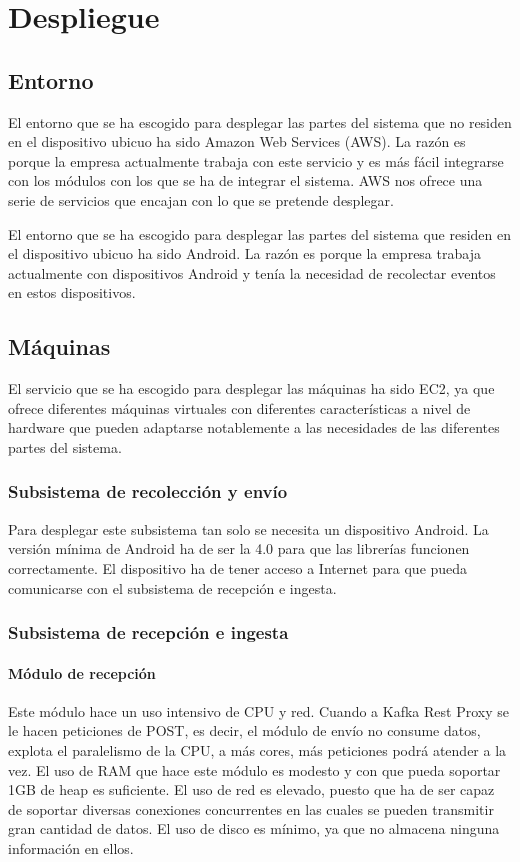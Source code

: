 \chapter{Despliegue} \label{cap:despligue}
\section{Entorno}
El entorno que se ha escogido para desplegar las partes del sistema que no residen en el dispositivo ubicuo ha sido Amazon Web Services (AWS). La razón es porque la empresa actualmente trabaja con este servicio y es más fácil integrarse con los módulos con los que se ha de integrar el sistema. AWS nos ofrece una serie de servicios que encajan con lo que se pretende desplegar.

El entorno que se ha escogido para desplegar las partes del sistema que residen en el dispositivo ubicuo ha sido Android. La razón es porque la empresa trabaja actualmente con dispositivos Android y tenía la necesidad de recolectar eventos en estos dispositivos.

\section{Máquinas}
El servicio que se ha escogido para desplegar las máquinas ha sido EC2\cite{Tfg:ec2}, ya que ofrece diferentes máquinas virtuales con diferentes características a nivel de hardware que pueden adaptarse notablemente a las necesidades de las diferentes partes del sistema.

\subsection{Subsistema de recolección y envío}
Para desplegar este subsistema tan solo se necesita un dispositivo Android. La versión mínima de Android ha de ser la 4.0 para que las librerías funcionen correctamente. El dispositivo ha de tener acceso a Internet para que pueda comunicarse con el subsistema de recepción e ingesta.

\subsection{Subsistema de recepción e ingesta}
\subsubsection{Módulo de recepción}
Este módulo hace un uso intensivo de CPU y red. Cuando a Kafka Rest Proxy se le hacen peticiones de POST, es decir, el módulo de envío no consume datos, explota el paralelismo de la CPU, a más cores, más peticiones podrá atender a la vez. El uso de RAM que hace este módulo es modesto y con que pueda soportar 1GB de heap es suficiente. El uso de red es elevado, puesto que ha de ser capaz de soportar diversas conexiones concurrentes en las cuales se pueden transmitir gran cantidad de datos. El uso de disco es mínimo, ya que no almacena ninguna información en ellos.
\\

